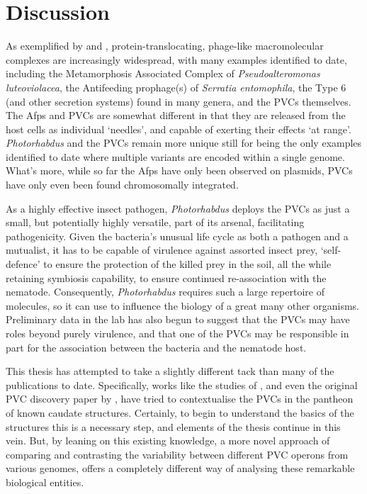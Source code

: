 \chapter{Discussion}\label{Discussion}
\pagestyle{IHA-fancy-style}

As exemplified by \cite{Sarris2014} and \cite{Hurst2004}, protein-translocating, phage-like macromolecular complexes are increasingly widespread, with many examples identified to date, including the Metamorphosis Associated Complex of \emph{Pseudoalteromonas luteoviolacea}, the Antifeeding prophage(s) of \emph{Serratia entomophila}, the Type 6 (and other secretion systems) found in many genera, and the PVCs themselves. The Afps and PVCs are somewhat different in that they are released from the host cells as individual `needles', and capable of exerting their effects `at range'. \emph{Photorhabdus} and the PVCs remain more unique still for being the only examples identified to date where multiple variants are encoded within a single genome. What's more, while so far the Afps have only been observed on plasmids, PVCs have only even been found chromosomally integrated.

As a highly effective insect pathogen, \emph{Photorhabdus} deploys the PVCs as just a small, but potentially highly versatile, part of its arsenal, facilitating pathogenicity. Given the bacteria's unusual life cycle as both a pathogen and a mutualist, it has to be capable of virulence against assorted insect prey, `self-defence' to ensure the protection of the killed prey in the soil, all the while retaining symbiosis capability, to ensure continued re-association with the nematode. Consequently, \emph{Photorhabdus} requires such a large repertoire of molecules, so it can use to influence the biology of a great many other organisms. Preliminary data in the lab has also begun to suggest that the PVCs may have roles beyond purely virulence, and that one of the PVCs may be responsible in part for the association between the bacteria and the nematode host.

This thesis has attempted to take a slightly different tack than many of the publications to date. Specifically, works like the studies of \cite{Sarris2014}, and even the original PVC discovery paper by \cite{Yang2006}, have tried to contextualise the PVCs in the pantheon of known caudate structures. Certainly, to begin to understand the basics of the structures this is a necessary step, and elements of the thesis continue in this vein. But, by leaning on this existing knowledge, a more novel approach of comparing and contrasting the variability between different PVC operons from various genomes, offers a completely different way of analysing these remarkable biological entities.

